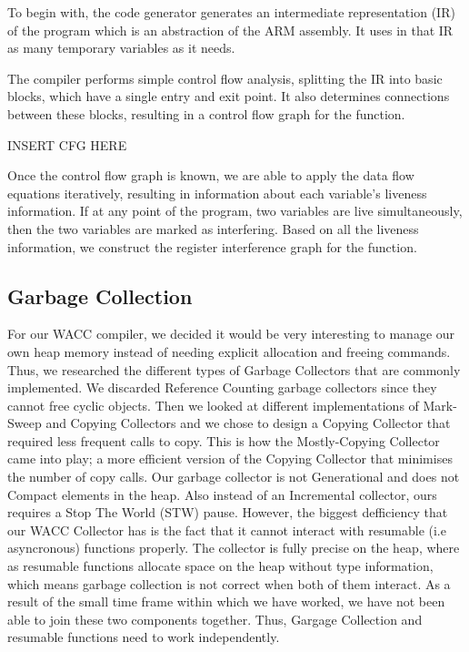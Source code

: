 \documentclass{article}
\begin{document}
To begin with, the code generator generates an intermediate representation (IR) of the program which is an abstraction of the ARM assembly.
It uses in that IR as many temporary variables as it needs.

The compiler performs simple control flow analysis, splitting the IR into basic blocks, which have a single entry and exit point. It
also determines connections between these blocks, resulting in a control flow graph for the function.

INSERT CFG HERE

Once the control flow graph is known, we are able to apply the data flow equations iteratively, resulting in information about each
variable's liveness information. If at any point of the program, two variables are live simultaneously, then the two variables are marked
as interfering. Based on all the liveness information, we construct the register interference graph for the function.

\subsection{Garbage Collection}
For our WACC compiler, we decided it would be very interesting to manage our own heap memory instead of needing explicit allocation and freeing commands. Thus, we researched the different types of Garbage Collectors that
are commonly implemented. We discarded Reference Counting garbage collectors since they cannot free cyclic objects. Then we looked at different implementations of Mark-Sweep and Copying Collectors and we chose to design a Copying Collector that required less frequent calls to copy. This is how the Mostly-Copying Collector came into play; a more efficient version of the Copying Collector that minimises the number of copy calls. Our garbage collector is not Generational and does not Compact elements in the heap. Also instead of an Incremental collector, ours requires a Stop The World (STW) pause. However, the biggest defficiency that our WACC Collector has is the fact that it cannot interact with resumable (i.e asyncronous) functions properly. The collector is fully precise on the heap, where as resumable functions allocate space on the heap without type information, which means garbage collection is not correct when both of them interact. As a result of the small time frame within which we have worked, we have not been able to join these two components together. Thus, Gargage Collection and resumable functions need to work independently. 
\end{document}
